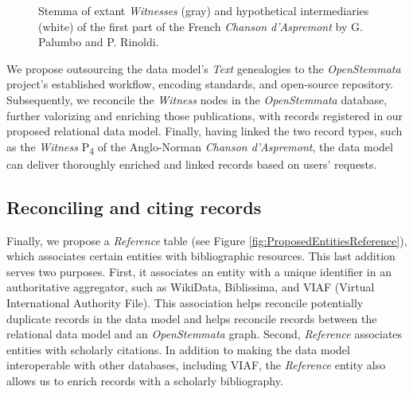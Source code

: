 \begin{figure}[htb!]
    \begin{center}
        
    \end{center}
\caption{Stemma of extant \textit{Witnesses} (gray) and hypothetical intermediaries (white)
of the first part of the French \textit{Chanson d'Aspremont} by G. Palumbo and P. Rinoldi.}
\label{fig:GraphFramework}
\end{figure}

We propose outsourcing the data model's \textit{Text} genealogies to the \textit{OpenStemmata} project's established workflow, encoding standards, and open-source repository. Subsequently, we reconcile the \textit{Witness} nodes in the \textit{OpenStemmata} database, further valorizing and enriching those publications, with records registered in our proposed relational data model. Finally, having linked the two record types, such as the \textit{Witness} P\textsubscript{4} of the Anglo-Norman \textit{Chanson d'Aspremont}, the data model can deliver thoroughly enriched and linked records based on users' requests.

\subsection{Reconciling and citing records}

Finally, we propose a \textit{Reference} table (see Figure \ref{fig:ProposedEntitiesReference}), which associates certain entities with bibliographic resources. This last addition serves two purposes. First, it associates an entity with a unique identifier in an authoritative aggregator, such as WikiData, Biblissima, and VIAF (Virtual International Authority File). This association helps reconcile potentially duplicate records in the data model and helps reconcile records between the relational data model and an \textit{OpenStemmata} graph. Second, \textit{Reference} associates entities with scholarly citations. In addition to making the data model interoperable with other databases, including VIAF, the \textit{Reference} entity also allows us to enrich records with a scholarly bibliography.

